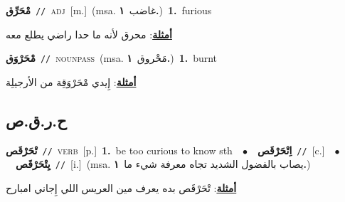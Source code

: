 \documentclass[10pt,a4paper,twoside]{article} %
\begin{document}
\begin{multicols}{2}
{\setlength\topsep{0pt}\textbf{\foreignlanguage{arabic}{مْحَرِّق}}\ {\color{gray}\texttt{//}\color{black}}\ \textsc{adj}\ [m.]\ \color{gray}(msa. \foreignlanguage{arabic}{غاضب}~\foreignlanguage{arabic}{\textbf{١.}})\color{black}\ \textbf{1.}~furious\  \begin{flushright}\color{gray}\foreignlanguage{arabic}{\textbf{\underline{\foreignlanguage{arabic}{أمثلة}}}: محرق لأنه ما حدا راضي يطلع معه}\end{flushright}\color{black}} \vspace{2mm}

{\setlength\topsep{0pt}\textbf{\foreignlanguage{arabic}{مْحَرْوَق}}\ {\color{gray}\texttt{//}\color{black}}\ \textsc{noun\textunderscore pass}\ \color{gray}(msa. \foreignlanguage{arabic}{مَحْروق}~\foreignlanguage{arabic}{\textbf{١.}})\color{black}\ \textbf{1.}~burnt\  \begin{flushright}\color{gray}\foreignlanguage{arabic}{\textbf{\underline{\foreignlanguage{arabic}{أمثلة}}}: إِيدي مْحَرْوَقِة من الأرجيلِة}\end{flushright}\color{black}} \vspace{2mm}

\vspace{-3mm}
\subsection*{\color{blue}\foreignlanguage{arabic}{ح.ر.ق.ص}\color{blue}{}} 

{\setlength\topsep{0pt}\textbf{\foreignlanguage{arabic}{تْحَرْقَص}}\ {\color{gray}\texttt{//}\color{black}}\ \textsc{verb}\ [p.]\ \textbf{1.}~be too curious to know sth\ \ $\bullet$\ \ \setlength\topsep{0pt}\textbf{\foreignlanguage{arabic}{اِتْحَرْقَص}}\ {\color{gray}\texttt{//}\color{black}}\ [c.]\ \ $\bullet$\ \ \setlength\topsep{0pt}\textbf{\foreignlanguage{arabic}{يِتْحَرْقَص}}\ {\color{gray}\texttt{//}\color{black}}\ [i.]\ \color{gray}(msa. \foreignlanguage{arabic}{يصاب بالفضول الشديد تجاه معرفة شيء ما}~\foreignlanguage{arabic}{\textbf{١.}})\color{black}\  \begin{flushright}\color{gray}\foreignlanguage{arabic}{\textbf{\underline{\foreignlanguage{arabic}{أمثلة}}}: تْحَرْقَص بده يعرف مين العريس اللي إِجاني امبارح}\end{flushright}\color{black}} \vspace{2mm}


\end{multicols}
\end{document}
